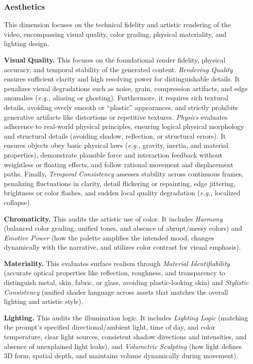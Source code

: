 \documentclass{llmxive}
\begin{document}
\subsubsection{Aesthetics}
\noindent
This dimension focuses on the technical fidelity and artistic rendering of the video, encompassing visual quality, color grading, physical materiality, and lighting design.

\noindent
\textbf{Visual Quality.} This focuses on the foundational render fidelity, physical accuracy, and temporal stability of the generated content. \textit{Rendering Quality} ensures sufficient clarity and high resolving power for distinguishable details. It penalizes visual degradations such as noise, grain, compression artifacts, and edge anomalies (\textit{e.g.,} aliasing or ghosting). Furthermore, it requires rich textural details, avoiding overly smooth or ``plastic'' appearances, and strictly prohibits generative artifacts like distortions or repetitive textures. \textit{Physics} evaluates adherence to real-world physical principles, ensuring logical physical morphology and structural details (avoiding shadow, reflection, or structural errors). It ensures objects obey basic physical laws (\textit{e.g.,} gravity, inertia, and material properties), demonstrate plausible force and interaction feedback without weightless or floating effects, and follow rational movement and displacement paths. Finally, \textit{Temporal Consistency} assesses stability across continuous frames, penalizing fluctuations in clarity, detail flickering or repainting, edge jittering, brightness or color flashes, and sudden local quality degradation (\textit{e.g.,} localized collapse).

\noindent
\textbf{Chromaticity.} This audits the artistic use of color. It includes \textit{Harmony} (balanced color grading, unified tones, and absence of abrupt/messy colors) and \textit{Emotive Power} (how the palette amplifies the intended mood, changes dynamically with the narrative, and utilizes color contrast for visual emphasis).

\noindent
\textbf{Materiality.} This evaluates surface realism through \textit{Material Identifiability} (accurate optical properties like reflection, roughness, and transparency to distinguish metal, skin, fabric, or glass, avoiding plastic-looking skin) and \textit{Stylistic Consistency} (unified shader language across assets that matches the overall lighting and artistic style).

\noindent
\textbf{Lighting.} This audits the illumination logic. It includes \textit{Lighting Logic} (matching the prompt's specified directional/ambient light, time of day, and color temperature, clear light sources, consistent shadow directions and intensities, and absence of unexplained light leaks), and \textit{Volumetric Sculpting} (how light defines 3D form, spatial depth, and maintains volume dynamically during movement).
\end{document}
